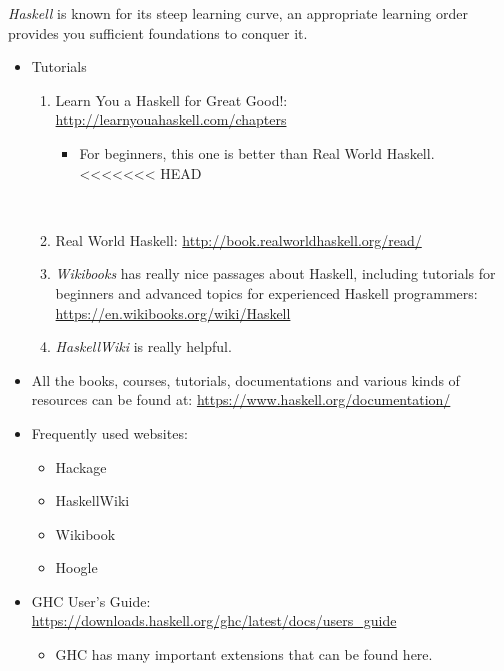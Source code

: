 \documentclass{article}
\begin{document}
\begin{itemize}
    \emph{Haskell} is known for its steep learning curve, an appropriate learning order provides you sufficient foundations to conquer it.
    \begin{itemize}
        \item Tutorials
        \begin{enumerate}
            \item Learn You a Haskell for Great Good!:
            \href{http://learnyouahaskell.com/chapters}{http://learnyouahaskell.com/chapters}
            \begin{itemize}
                \item For beginners, this one is better than Real World Haskell.
<<<<<<< HEAD
            \end{itemize}\
            \item Real World Haskell:
            \href{http://book.realworldhaskell.org/read/}{http://book.realworldhaskell.org/read/}
            \item \emph{Wikibooks} has really nice passages about Haskell, including tutorials for beginners and advanced topics for experienced Haskell programmers:\\
            \href{https://en.wikibooks.org/wiki/Haskell}{https://en.wikibooks.org/wiki/Haskell}
            \item \emph{HaskellWiki} is really helpful.
        \end{enumerate}
        \item All the books, courses, tutorials, documentations and various kinds of resources can be found at:
        \href{https://www.haskell.org/documentation/}{https://www.haskell.org/documentation/}
        \item Frequently used websites:
        \begin{itemize}
            \item Hackage
            \item HaskellWiki
            \item Wikibook
            \item Hoogle
        \end{itemize}
        \item GHC User’s Guide:\\
        \href{https://downloads.haskell.org/ghc/latest/docs/users_guide}{https://downloads.haskell.org/ghc/latest/docs/users\_guide}
        \begin{itemize}
            \item GHC has many important extensions that can be found here.

\end{itemize}
\end{itemize}
\end{itemize}
\end{document}
